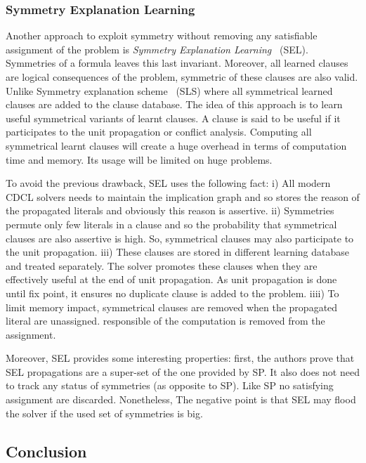 \subsubsection{Symmetry Explanation Learning}


Another approach to exploit symmetry without removing any satisfiable assignment of the problem
is \emph{Symmetry Explanation Learning}~\cite{devriendt2017symmetric} (SEL). 
Symmetries of a formula leaves this last invariant. Moreover, all learned clauses are logical consequences of the problem, symmetric of these clauses are also valid.
Unlike Symmetry explanation scheme~\cite{benhamou2010enhancing} (SLS) where all symmetrical learned clauses
are added to the clause database.
The idea of this approach is to learn useful symmetrical variants of learnt clauses.
 A clause is said to be useful if it participates to the unit propagation or conflict analysis.
Computing all symmetrical learnt clauses will create a huge overhead in terms of computation time and memory.
Its usage will be limited on huge problems.

To avoid the previous drawback, SEL uses the following fact:
i) All modern CDCL solvers needs to maintain the implication graph and so stores the reason of the propagated literals and
obviously this reason is assertive.
ii) Symmetries permute only few literals in a clause and so the probability that symmetrical clauses are also assertive is high.
So, symmetrical clauses may also participate to the unit propagation.
iii) These clauses are stored in different learning database and 
treated separately. The solver promotes these clauses when they are effectively useful
at the end of unit propagation. As unit propagation is done until fix point, it
ensures no duplicate clause is added to the problem.
iiii) To limit memory impact, symmetrical clauses are removed when the propagated literal are unassigned.
responsible of the computation is removed from the assignment.

Moreover, SEL provides some interesting properties:
first, the authors prove that SEL propagations are a super-set of the one provided by SP. 
It also does not need to track any status of symmetries (as opposite to SP).
Like SP no satisfying assignment are discarded.
Nonetheless, The negative point is that SEL may flood the solver if the used set of symmetries is big. 


\subsection{Conclusion} 

